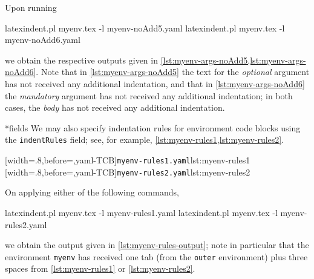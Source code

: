 	Upon running 
	\begin{commandshell}
latexindent.pl myenv.tex -l myenv-noAdd5.yaml  
latexindent.pl myenv.tex -l myenv-noAdd6.yaml  
\end{commandshell}
	we obtain the respective outputs given in
	\cref{lst:myenv-args-noAdd5,lst:myenv-args-noAdd6}. Note that in
	\cref{lst:myenv-args-noAdd5} the text for the \emph{optional} argument has not received
	any additional indentation, and that in \cref{lst:myenv-args-noAdd6} the \emph{mandatory}
	argument has not received any additional indentation; in both cases, the \emph{body} has
	not received any additional indentation.

	\begin{minipage}{.45\textwidth}
	\end{minipage}
	\hfill
	\begin{minipage}{.45\textwidth}
	\end{minipage}

*{fields}
	We may also specify indentation rules for environment code blocks using the
	\texttt{indentRules} field; see, for example, \cref{lst:myenv-rules1,lst:myenv-rules2}.

	\begin{cmhtcbraster}[raster column skip=.1\linewidth]
		[width=.8\linewidth,before=\centering,yaml-TCB]{\texttt{myenv-rules1.yaml}}{lst:myenv-rules1}
		[width=.8\linewidth,before=\centering,yaml-TCB]{\texttt{myenv-rules2.yaml}}{lst:myenv-rules2}
	\end{cmhtcbraster}

	On applying either of the following commands, 
	\begin{commandshell}
latexindent.pl myenv.tex -l myenv-rules1.yaml  
latexindent.pl myenv.tex -l myenv-rules2.yaml  
\end{commandshell}
	we obtain the output given in \cref{lst:myenv-rules-output}; note in particular that the
	environment \texttt{myenv} has received one tab (from the \texttt{outer} environment)
	plus three spaces from \cref{lst:myenv-rules1} or \ref{lst:myenv-rules2}.

